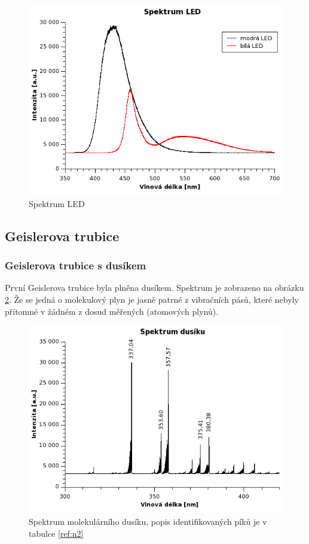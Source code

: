 \documentclass[12pt]{article}
\begin{document}
\begin{figure}[h!]
  \centering
  \includegraphics[width=13cm]{img/diody.png}
  \caption{Spektrum LED}
  \label{fig:dioda} 
\end{figure}
\clearpage

\subsection{Geislerova trubice}
\subsubsection{Geislerova trubice s dusíkem}
První Geislerova trubice byla plněna dusíkem. Spektrum je zobrazeno na obrázku \ref{fig:dusik}. Že se jedná o molekulový plyn je jasně patrné z vibračních pásů, které nebyly přítomné v žádném z dosud měřených (atomových plynů). 

\begin{figure}[h!]
  \centering
  \includegraphics[width=13cm]{img/n2.png}
  \caption{Spektrum molekulárního dusíku, popis identifikovaných píků je v tabulce \ref{ref:n2}}
  \label{fig:dusik} 
\end{figure}
\end{document}
